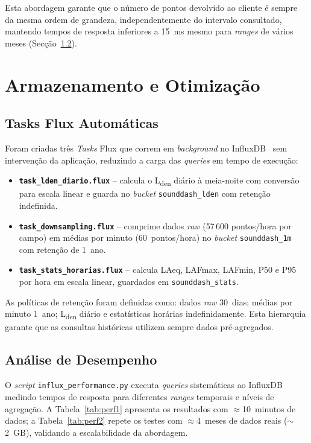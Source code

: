 \documentclass[12pt,a4paper]{report}
\begin{document}
Esta abordagem garante que o número de pontos devolvido ao cliente é sempre da mesma ordem de grandeza, independentemente do intervalo consultado, mantendo tempos de resposta inferiores a 15~ms mesmo para \textit{ranges} de vários meses (Secção~\ref{sec:perf}).

\section{Armazenamento e Otimização}
\label{sec:tasks}

\subsection{Tasks Flux Automáticas}

Foram criadas três \textit{Tasks} Flux que correm em \textit{background} no InfluxDB~\cite{influxdb} sem intervenção da aplicação, reduzindo a carga das \textit{queries} em tempo de execução:

\begin{itemize}
  \item \textbf{\texttt{task\_lden\_diario.flux}} -- calcula o L\textsubscript{den} diário à meia-noite com conversão para escala linear e guarda no \textit{bucket} \texttt{sounddash\_lden} com retenção indefinida.
  \item \textbf{\texttt{task\_downsampling.flux}} -- comprime dados \textit{raw} (57\,600 pontos/hora por campo) em médias por minuto (60~pontos/hora) no \textit{bucket} \texttt{sounddash\_1m} com retenção de 1~ano.
  \item \textbf{\texttt{task\_stats\_horarias.flux}} -- calcula LAeq, LAFmax, LAFmin, P50 e P95 por hora em escala linear, guardados em \texttt{sounddash\_stats}.
\end{itemize}

As políticas de retenção foram definidas como: dados \textit{raw} 30~dias; médias por minuto 1~ano; L\textsubscript{den} diário e estatísticas horárias indefinidamente. Esta hierarquia garante que as consultas históricas utilizem sempre dados pré-agregados.

\subsection{Análise de Desempenho}
\label{sec:perf}

O \textit{script} \texttt{influx\_performance.py} executa \textit{queries} sistemáticas ao InfluxDB medindo tempos de resposta para diferentes \textit{ranges} temporais e níveis de agregação. A Tabela~\ref{tab:perf1} apresenta os resultados com $\approx$10~minutos de dados; a Tabela~\ref{tab:perf2} repete os testes com $\approx$4~meses de dados reais ($\sim$2~GB), validando a escalabilidade da abordagem.
\end{document}
